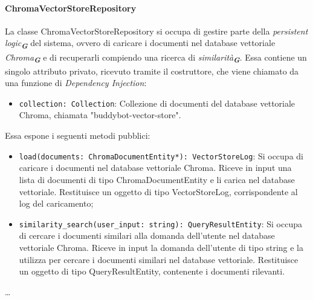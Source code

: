 \paragraph{ChromaVectorStoreRepository}
\label{sec:chroma_vector_store_repository}
La classe ChromaVectorStoreRepository si occupa di gestire parte della \emph{persistent logic}\textsubscript{\textbf{\textit{G}}} del sistema, ovvero di caricare i documenti nel database vettoriale \emph{Chroma}\textsubscript{\textbf{\textit{G}}} e di recuperarli compiendo una ricerca di \emph{similarità}\textsubscript{\textbf{\textit{G}}}. Essa contiene un singolo attributo privato, ricevuto tramite il costruttore, che viene chiamato da una funzione di \emph{Dependency Injection}:
\begin{itemize}
    \item \texttt{collection: Collection}: Collezione di documenti del database vettoriale Chroma, chiamata "buddybot-vector-store".
\end{itemize}
Essa espone i seguenti metodi pubblici:
\begin{itemize}
    \item \texttt{load(documents: ChromaDocumentEntity*): VectorStoreLog}: Si occupa di caricare i documenti nel database vettoriale Chroma. Riceve in input una lista di documenti di tipo ChromaDocumentEntity e li carica nel database vettoriale. Restituisce un oggetto di tipo VectorStoreLog, corrispondente al log del caricamento;
    \item \texttt{similarity\_search(user\_input: string): QueryResultEntity}: Si occupa di cercare i documenti similari alla domanda dell'utente nel database vettoriale Chroma. Riceve in input la domanda dell'utente di tipo string e la utilizza per cercare i documenti similari nel database vettoriale. Restituisce un oggetto di tipo QueryResultEntity, contenente i documenti rilevanti.
\end{itemize}

\dots

